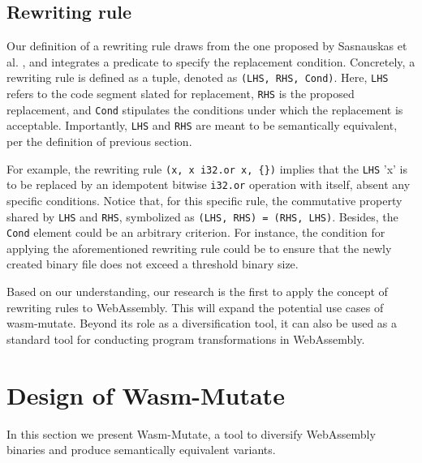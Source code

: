 \documentclass[sigplan,screen]{acmart}
\newcommand{\tool}{{\sc Wasm-Mutate}\xspace}
\begin{document}
\subsection{Rewriting rule}
\label{rewriting}

Our definition of a rewriting rule draws from the one proposed by Sasnauskas et al. \cite{2017arXiv171104422S}, and integrates a predicate to specify the replacement condition.
Concretely, a rewriting rule is defined as a tuple, denoted as \texttt{(LHS, RHS, Cond)}. Here, \texttt{LHS} refers to the code segment slated for replacement, \texttt{RHS} is the proposed replacement, and \texttt{Cond} stipulates the conditions under which the replacement is acceptable.
Importantly, \texttt{LHS} and \texttt{RHS} are meant to be semantically equivalent, per the definition of previous section.


For example, the rewriting rule \texttt{(x,\ x\ i32.or\ x, \{\})} implies that the \texttt{LHS} 'x' is to be replaced by an idempotent bitwise \texttt{i32.or} operation with itself, absent any specific conditions.
Notice that, for this specific rule, the commutative property shared by \texttt{LHS} and \texttt{RHS}, symbolized as \texttt{(LHS, RHS) = (RHS, LHS)}.
Besides, the \texttt{Cond} element could be an arbitrary criterion. 
For instance, the condition for applying the aforementioned rewriting rule could be to ensure that the newly created binary file does not exceed a threshold binary size.

Based on our understanding, our research is the first to apply the concept of rewriting rules to WebAssembly.
This will expand the potential use cases of wasm-mutate. 
Beyond its role as a diversification tool, it can also be used as a standard tool for conducting program transformations in WebAssembly.


\section {Design of Wasm-Mutate}
\label{tech}

In this section we present \tool, a tool to diversify
WebAssembly binaries and produce semantically equivalent variants.
\end{document}
